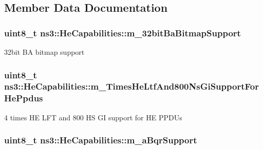 \subsection{Member Data Documentation}
\subsubsection[{\texorpdfstring{m\+\_\+32bit\+Ba\+Bitmap\+Support}{m_32bitBaBitmapSupport}}]{\setlength{\rightskip}{0pt plus 5cm}uint8\+\_\+t ns3\+::\+He\+Capabilities\+::m\+\_\+32bit\+Ba\+Bitmap\+Support\hspace{0.3cm}{\ttfamily [private]}}\hypertarget{classns3_1_1HeCapabilities_a7629d4adebd2aaf5af6838ca23718485}{}\label{classns3_1_1HeCapabilities_a7629d4adebd2aaf5af6838ca23718485}


32bit BA bitmap support 

\subsubsection[{\texorpdfstring{m\+\_\+4\+Times\+He\+Ltf\+And800\+Ns\+Gi\+Support\+For\+He\+Ppdus}{m_4TimesHeLtfAnd800NsGiSupportForHePpdus}}]{\setlength{\rightskip}{0pt plus 5cm}uint8\+\_\+t ns3\+::\+He\+Capabilities\+::m\+\_\+Times\+He\+Ltf\+And800\+Ns\+Gi\+Support\+For\+He\+Ppdus\hspace{0.3cm}{\ttfamily [private]}}\hypertarget{classns3_1_1HeCapabilities_aaf569f297a059a329925c6789f2b1266}{}\label{classns3_1_1HeCapabilities_aaf569f297a059a329925c6789f2b1266}


4 times HE L\+FT and 800 HS GI support for HE P\+P\+D\+Us 

\subsubsection[{\texorpdfstring{m\+\_\+a\+Bqr\+Support}{m_aBqrSupport}}]{\setlength{\rightskip}{0pt plus 5cm}uint8\+\_\+t ns3\+::\+He\+Capabilities\+::m\+\_\+a\+Bqr\+Support\hspace{0.3cm}{\ttfamily [private]}}\hypertarget{classns3_1_1HeCapabilities_a1567eb654d5cbfbf223638e15c7516fe}{}\label{classns3_1_1HeCapabilities_a1567eb654d5cbfbf223638e15c7516fe}


